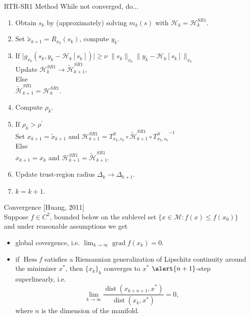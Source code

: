 \documentclass{beamer}
\begin{document}
\begin{frame}{RTR-SR1 Method}
    While not converged, do... 

    \begin{enumerate}
        \item Obtain $s_k$ by (approximately) solving $m_k(s)$ with $\mathcal{H}_k = \mathcal{H}^{SR1}_k$.
        \item Set $\widetilde{x}_{k+1} = R_{x_k}(s_k)$, compute $y_k$.
        \item If $\lvert g_{x_k}(s_k, y_k - \mathcal{H}_k[s_k]) \rvert \geq \nu \; \lVert s_k \rVert_{x_k} \lVert y_k - \mathcal{H}_k[s_k] \rVert_{x_k}$ \\
        Update $\mathcal{H}^{SR1}_k \rightarrow \widetilde{\mathcal{H}}^{SR1}_{k+1}$, \\
        Else \\
        $\widetilde{\mathcal{H}}^{SR1}_{k+1} = \mathcal{H}^{SR1}_{k}$. 
        \item Compute $\rho_k$.
        \item If $\rho_k > \rho^{\prime}$ \\
        Set $x_{k+1} = \widetilde{x}_{k+1}$ and $\mathcal{H}^{SR1}_{k+1} = T^{S}_{x_k, s_k} \circ \widetilde{\mathcal{H}}^{SR1}_{k+1} \circ  {T^{S}_{x_k, s_k}}^{-1}$ \\
        Else \\
        $x_{k+1} = x_k$ and $\mathcal{H}^{SR1}_{k+1} = \widetilde{\mathcal{H}}^{SR1}_{k+1}$.
        \item Update trust-region radius $\Delta_k \rightarrow \Delta_{k+1}$.
        \item $k = k+1$.
    \end{enumerate}
\end{frame}

\begin{frame}{Convergence}
    \vspace{-1\baselineskip}\hfill{\tiny{[Huang, 2011]}} \\[0.2\baselineskip]
    Suppose $f \in C^2$, bounded below on the sublevel set $\{ x \in \mathcal{M} \colon f(x) \leq f(x_0) \}$ and under reasonable assumptions we get 
    \begin{itemize}
        \item \alert{global covergence}, i.e. $\lim_{k \rightarrow \infty} \operatorname{grad} f(x_k) = 0$.
        \item if $\operatorname{Hess} f$ satisfies a Riemannian generalization of Lipschitz continuity around the minimizer $x^*$, then $\{ x_k \}_k$ converges to $x^*$ $\alert{n + 1}$\alert{-step superlinearly}, i.e. \begin{equation*}\lim_{k \rightarrow \infty} \frac{\operatorname{dist}(x_{k+n+1}, x^*)}{\operatorname{dist}(x_k, x^*)} = 0, \end{equation*} where $n$ is the dimension of the manifold.
    \end{itemize}
\end{frame}
\end{document}
